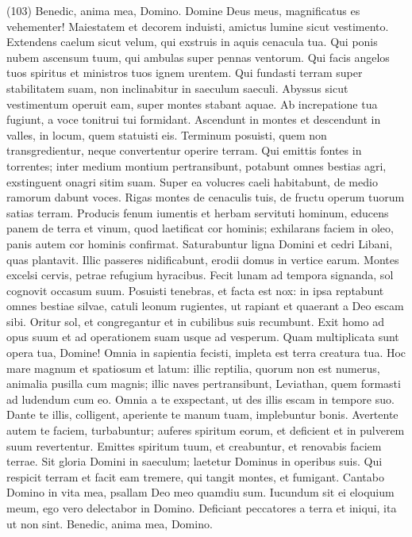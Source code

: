 \begin{biblechapter}  (103) 
\verse Benedic, anima mea, Domino. Domine Deus meus, magnificatus es vehementer! Maiestatem et decorem induisti, 
\verse amictus lumine sicut vestimento. Extendens caelum sicut velum, 
\verse qui exstruis in aquis cenacula tua. Qui ponis nubem ascensum tuum, qui ambulas super pennas ventorum. 
\verse Qui facis angelos tuos spiritus et ministros tuos ignem urentem. 
\verse Qui fundasti terram super stabilitatem suam, non inclinabitur in saeculum saeculi. 
\verse Abyssus sicut vestimentum operuit eam, super montes stabant aquae. 
\verse Ab increpatione tua fugiunt, a voce tonitrui tui formidant. 
\verse Ascendunt in montes et descendunt in valles, in locum, quem statuisti eis. 
\verse Terminum posuisti, quem non transgredientur, neque convertentur operire terram. 
\verse Qui emittis fontes in torrentes; inter medium montium pertransibunt, 
\verse potabunt omnes bestias agri, exstinguent onagri sitim suam. 
\verse Super ea volucres caeli habitabunt, de medio ramorum dabunt voces. 
\verse Rigas montes de cenaculis tuis, de fructu operum tuorum satias terram. 
\verse Producis fenum iumentis et herbam servituti hominum, educens panem de terra 
\verse et vinum, quod laetificat cor hominis; exhilarans faciem in oleo, panis autem cor hominis confirmat. 
\verse Saturabuntur ligna Domini et cedri Libani, quas plantavit. 
\verse Illic passeres nidificabunt, erodii domus in vertice earum. 
\verse Montes excelsi cervis, petrae refugium hyracibus. 
\verse Fecit lunam ad tempora signanda, sol cognovit occasum suum. 
\verse Posuisti tenebras, et facta est nox: in ipsa reptabunt omnes bestiae silvae, 
\verse catuli leonum rugientes, ut rapiant et quaerant a Deo escam sibi. 
\verse Oritur sol, et congregantur et in cubilibus suis recumbunt. 
\verse Exit homo ad opus suum et ad operationem suam usque ad vesperum. 
\verse Quam multiplicata sunt opera tua, Domine! Omnia in sapientia fecisti, impleta est terra creatura tua. 
\verse Hoc mare magnum et spatiosum et latum: illic reptilia, quorum non est numerus, animalia pusilla cum magnis; 
\verse illic naves pertransibunt, Leviathan, quem formasti ad ludendum cum eo. 
\verse Omnia a te exspectant, ut des illis escam in tempore suo. 
\verse Dante te illis, colligent, aperiente te manum tuam, implebuntur bonis. 
\verse Avertente autem te faciem, turbabuntur; auferes spiritum eorum, et deficient et in pulverem suum revertentur. 
\verse Emittes spiritum tuum, et creabuntur, et renovabis faciem terrae. 
\verse Sit gloria Domini in saeculum; laetetur Dominus in operibus suis. 
\verse Qui respicit terram et facit eam tremere, qui tangit montes, et fumigant. 
\verse Cantabo Domino in vita mea, psallam Deo meo quamdiu sum. 
\verse Iucundum sit ei eloquium meum, ego vero delectabor in Domino. 
\verse Deficiant peccatores a terra et iniqui, ita ut non sint. Benedic, anima mea, Domino. 
\end{biblechapter}

